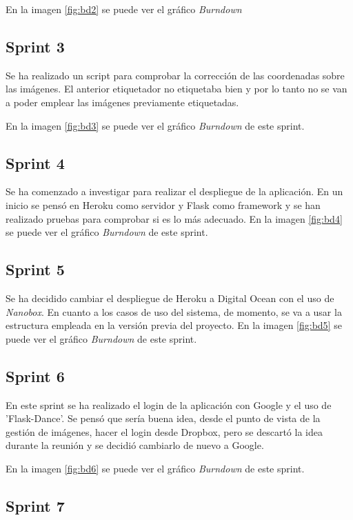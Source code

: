 En la imagen \ref{fig:bd2} se puede ver el gráfico \textit{Burndown} 

\subsection{Sprint 3}
Se ha realizado un script para comprobar la corrección de las coordenadas sobre las imágenes. El anterior etiquetador no etiquetaba bien y por lo tanto no se van a poder emplear las imágenes previamente etiquetadas.

En la imagen \ref{fig:bd3} se puede ver el gráfico \textit{Burndown} de este sprint.
\subsection{Sprint 4}
Se ha comenzado a investigar para realizar el despliegue de la aplicación. En un inicio se pensó en Heroku como servidor y Flask como framework y se han realizado pruebas para comprobar si es lo más adecuado. 
En la imagen \ref{fig:bd4} se puede ver el gráfico \textit{Burndown} de este sprint.
\subsection{Sprint 5}
Se ha decidido cambiar el despliegue de Heroku a Digital Ocean con el uso de \textit{Nanobox}. En cuanto a los casos de uso del sistema, de momento, se va a usar la estructura empleada en la versión previa del proyecto.
En la imagen \ref{fig:bd5} se puede ver el gráfico \textit{Burndown} de este sprint.
\subsection{Sprint 6}
En este sprint se ha realizado el login de la aplicación con Google y el uso de 'Flask-Dance'. Se pensó que sería buena idea, desde el punto de vista de la gestión de imágenes, hacer el login desde Dropbox, pero se descartó la idea durante la reunión y se decidió cambiarlo de nuevo a Google.


En la imagen \ref{fig:bd6} se puede ver el gráfico \textit{Burndown} de este sprint.
\subsection{Sprint 7}


